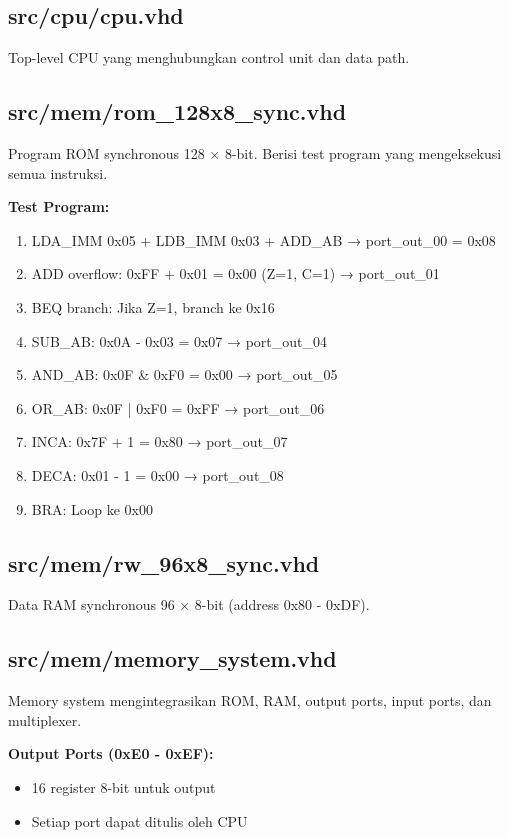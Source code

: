 \documentclass[12pt,a4paper]{report}
\begin{document}
\subsection{src/cpu/cpu.vhd}

Top-level CPU yang menghubungkan control unit dan data path.

\subsection{src/mem/rom\_128x8\_sync.vhd}

Program ROM synchronous 128 × 8-bit. Berisi test program yang mengeksekusi semua instruksi.

\textbf{Test Program:}
\begin{enumerate}
  \item LDA\_IMM 0x05 + LDB\_IMM 0x03 + ADD\_AB → port\_out\_00 = 0x08
  \item ADD overflow: 0xFF + 0x01 = 0x00 (Z=1, C=1) → port\_out\_01
  \item BEQ branch: Jika Z=1, branch ke 0x16
  \item SUB\_AB: 0x0A - 0x03 = 0x07 → port\_out\_04
  \item AND\_AB: 0x0F \& 0xF0 = 0x00 → port\_out\_05
  \item OR\_AB: 0x0F | 0xF0 = 0xFF → port\_out\_06
  \item INCA: 0x7F + 1 = 0x80 → port\_out\_07
  \item DECA: 0x01 - 1 = 0x00 → port\_out\_08
  \item BRA: Loop ke 0x00
\end{enumerate}

\subsection{src/mem/rw\_96x8\_sync.vhd}

Data RAM synchronous 96 × 8-bit (address 0x80 - 0xDF).

\subsection{src/mem/memory\_system.vhd}

Memory system mengintegrasikan ROM, RAM, output ports, input ports, dan multiplexer.

\textbf{Output Ports (0xE0 - 0xEF):}
\begin{itemize}
  \item 16 register 8-bit untuk output
  \item Setiap port dapat ditulis oleh CPU
\end{itemize}
\end{document}
